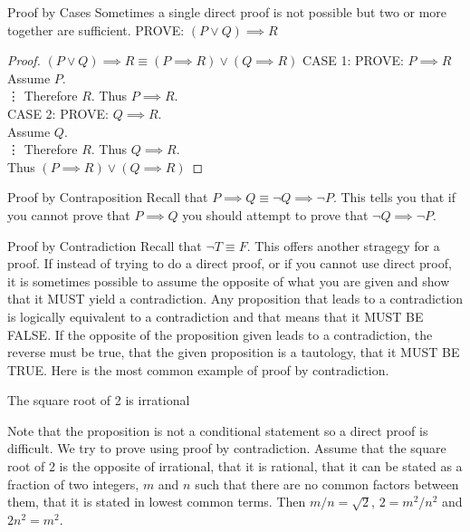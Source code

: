 \documentclass{beamer}
\begin{document}
\begin{frame}{Proof by Cases}
Sometimes a single direct proof is not possible but two or more together are sufficient.
PROVE: $(P \lor Q) \implies R$
\begin{proof}
$(P \lor Q) \implies R \equiv (P\implies R) \lor (Q \implies R)$ 
CASE 1: PROVE: $P\implies R$
  Assume $P$.\\
  \vdots
  Therefore $R$. Thus $P\implies R$.\\


CASE 2: PROVE: $Q \implies R$.\\
  Assume $Q$.\\
  \vdots 
  Therefore $R$. Thus $Q\implies R$.\\

Thus $(P \implies R) \lor (Q \implies R)$
\end{proof}
\end{frame}

\begin{frame}{Proof by Contraposition}
Recall that $P\implies Q \equiv \neg Q \implies \neg P$.
This tells you that if you cannot prove that $P \implies Q$ you should attempt to prove that $\neg Q \implies \neg P$. 
\end{frame}

\begin{frame}{Proof by Contradiction}
Recall that $\neg T \equiv F$. This offers another stragegy for a proof. If instead of trying to do a direct proof, or if you cannot use direct proof, it is sometimes possible to assume the opposite of what you are given and show that it MUST yield a contradiction. Any proposition that leads to a contradiction is logically equivalent to a contradiction and that means that it MUST BE FALSE. If the opposite of the proposition given leads to a contradiction, the reverse must be true, that the given proposition is a tautology, that it MUST BE TRUE. Here is the most common example of proof by contradiction.
\end{frame}

\begin{frame}{The square root of 2 is irrational}

Note that the proposition is not a conditional statement so a direct proof is difficult. We try to prove using proof by contradiction. Assume that the square root of 2 is the opposite of irrational, that it is rational, that it can be stated as a fraction of two integers, $m$ and $n$ such that there are no common factors between them, that it is stated in lowest common terms. Then $m/n=\sqrt{2}$,  $2=m^2/n^2$ and $2n^2=m^2$. 

\end{frame}
\end{document}
